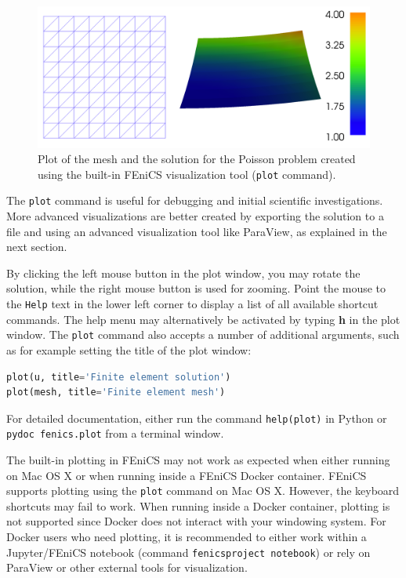 \documentclass[graybox,envcountchap,sectrefs,final]{svmonodo}
\newenvironment{warning_mdfboxadmon}[1][]{
\begin{warning_mdfboxmdframed}[frametitle=#1]
}
{
\end{warning_mdfboxmdframed}
}
\begin{document}
\begin{figure}[!ht]  %
  \centerline{\includegraphics[width=0.95\linewidth]{fig/poisson_plot.png}}
  \caption{
  Plot of the mesh and the solution for the Poisson problem created using the built-in FEniCS visualization tool (\texttt{plot} command). \label{fig:poisson_plot}
  }
\end{figure}

The \texttt{plot} command is useful for debugging and initial scientific
investigations. More advanced visualizations are better created by
exporting the solution to a file and using an advanced visualization
tool like ParaView, as explained in the next section.

By clicking the left mouse button in the plot window, you may rotate
the solution, while the right mouse button is used for zooming. Point
the mouse to the \texttt{Help} text in the lower left corner to display a
list of all available shortcut commands. The help menu may
alternatively be activated by typing \textbf{h} in the plot window. The
\texttt{plot} command also accepts a number of additional arguments, such as
for example setting the title of the plot window:

\begin{lstlisting}[language=Python,style=graycolor]
plot(u, title='Finite element solution')
plot(mesh, title='Finite element mesh')
\end{lstlisting}
For detailed documentation, either run the command \texttt{help(plot)} in
Python or \texttt{pydoc fenics.plot} from a terminal window.


\begin{warning_mdfboxadmon}
The built-in plotting in FEniCS may not work as expected when either
running on Mac OS X or when running inside a FEniCS Docker container.
FEniCS supports plotting using the \texttt{plot} command on Mac OS
X. However, the keyboard shortcuts may fail
to work. When running inside a Docker container, plotting is not
supported since Docker does not interact with your windowing system.
For Docker users who need plotting, it is recommended to either work
within a Jupyter/FEniCS notebook (command \texttt{fenicsproject notebook})
or rely on ParaView or other external tools for visualization.
\end{warning_mdfboxadmon} %
\end{document}
